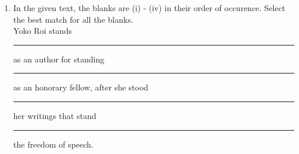 \documentclass[journal,12pt,onecolumn]{IEEEtran}
\theoremstyle{remark}
\begin{document}
\begin{enumerate}
\item In the given text, the blanks are (i) - (iv) in their order of occurence. Select the best match for all the blanks.\\
Yoko Roi stands \rule{1.5cm}{0.4pt} as an author for standing \rule{1.5cm}{0.4pt} as an honorary fellow, after she stood \rule{1.5cm}{0.4pt} her writings that stand \rule{1.5cm}{0.4pt} the freedom of speech.
\par\hfill{}
    \begin{enumerate}
    \end{enumerate}


\end{enumerate}
\end{document}
